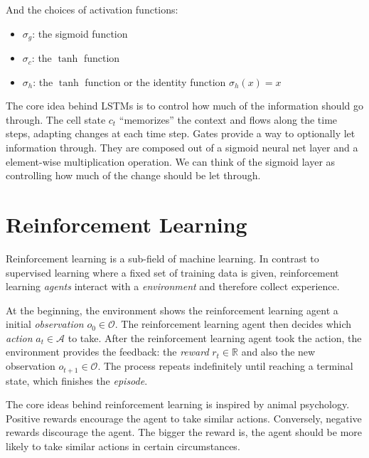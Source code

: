         And the choices of activation functions:

        \begin{itemize}
            \item $\sigma_g$: the sigmoid function
            \item $\sigma_c$: the $\tanh$ function
            \item $\sigma_h$: the $\tanh$ function or the identity function $\sigma_h(x) = x$
        \end{itemize}

        The core idea behind LSTMs is to control how much of the information should go through. \cite{Ola2015}
        The cell state $c_t$ ``memorizes'' the context and flows along the time steps,
        adapting changes at each time step.
        Gates provide a way to optionally let information through.
        They are composed out of a sigmoid neural net layer and a element-wise multiplication operation.
        We can think of the sigmoid layer as controlling how much of the change should be let through.

\section{Reinforcement Learning}

    Reinforcement learning is a sub-field of machine learning.
    In contrast to supervised learning where a fixed set of training data is given,
    reinforcement learning \emph{agents} interact with a \emph{environment} and therefore collect experience.

    At the beginning, the environment shows the reinforcement learning agent
    a initial \emph{observation} $o_0 \in \mathcal{O}$.
    The reinforcement learning agent then decides which \emph{action} $a_t \in \mathcal{A}$ to take.
    After the reinforcement learning agent took the action,
    the environment provides the feedback: the \emph{reward} $r_t \in \mathbb{R}$
    and also the new observation $o_{t+1} \in \mathcal{O}$.
    The process repeats indefinitely until reaching a terminal state,
    which finishes the \emph{episode}.

    The core ideas behind reinforcement learning is inspired by animal psychology.
    Positive rewards encourage the agent to take similar actions.
    Conversely, negative rewards discourage the agent.
    The bigger the reward is, the agent should be more likely to take similar actions in certain circumstances.

